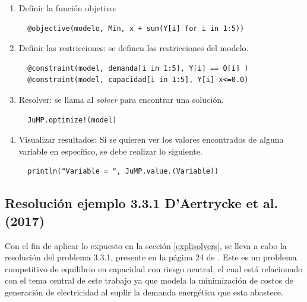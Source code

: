 \begin{enumerate}
  \item Definir la función objetivo:
  
  \begin{footnotesize}
  \begin{lstlisting}
  @objective(modelo, Min, x + sum(Y[i] for i in 1:5)) 
   \end{lstlisting}
  \end{footnotesize}
  
  \item Definir las restricciones: se definen las restricciones del modelo.
  
  \begin{footnotesize}
  \begin{lstlisting}
  @constraint(model, demanda[i in 1:5], Y[i] == Q[i] )
  @constraint(model, capacidad[i in 1:5], Y[i]-x<=0.0)
  \end{lstlisting}
  \end{footnotesize}
  
  \item  Resolver: se llama al \textit{solver} para encontrar una solución.
  
  \begin{footnotesize}
   \begin{lstlisting}
  JuMP.optimize!(model)
  \end{lstlisting}
  \end{footnotesize}
 
  
  \item Visualizar resultados: Si se quieren ver los valores encontrados de alguna variable en específico, se debe realizar lo siguiente.
  
  \begin{footnotesize}
  \begin{lstlisting}
  println("Variable = ", JuMP.value.(Variable))
  \end{lstlisting}
  \end{footnotesize}
  
\end{enumerate}



\subsection{Resolución ejemplo 3.3.1 D'{}Aertrycke et al. (2017)}

Con el fin de aplicar lo expuesto en la sección \ref{explisolvers}, se lleva a cabo la resolución del problema 3.3.1, presente en la página 24 de . Este es un problema competitivo de equilibrio en capacidad con riesgo neutral, el cual está relacionado con el tema central de este trabajo ya que modela la minimización de costos de generación de electricidad al suplir la demanda energética que esta abastece. 
\vspace{2.5mm}

